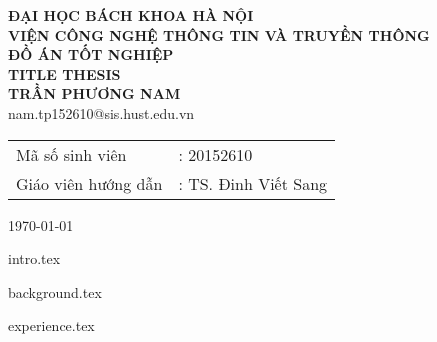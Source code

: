 \documentclass[11pt,a4paper]{article}
\author{TRẦN PHƯƠNG NAM}
\begin{document}

\begin{titlepage}
\begin{center}
\Large{\textbf{ĐẠI HỌC BÁCH KHOA HÀ NỘI}}\\[3mm]
\Large{\textbf{VIỆN CÔNG NGHỆ THÔNG TIN VÀ TRUYỀN THÔNG}}\\[3mm]
\vspace{7cm}
\huge{\textbf{ĐỒ ÁN TỐT NGHIỆP}}\\[5mm]
\huge{\textbf{TITLE THESIS}}\\[3mm]
\Large{\textbf{TRẦN PHƯƠNG NAM}}\\[1mm]
\Large{nam.tp152610@sis.hust.edu.vn}\\

\vspace{6cm}
\begin{tabular}{ll}
Mã số sinh viên & : 20152610 \\
Giáo viên hướng dẫn & : TS. Đinh Viết Sang
\end{tabular}
\vfill

\today
\end{center}
\end{titlepage}



\tableofcontents
\pagebreak
\renewcommand{\thefigure}{\arabic{section}.\arabic{figure}} %
\renewcommand{\thetable}{\arabic{section}.\arabic{table}} %


\listoftables
\pagebreak

\listoffigures
\pagebreak


\pagebreak

{intro.tex}

\pagebreak
%
\setcounter{figure}{0}
\setcounter{table}{0}


{background.tex}

\pagebreak

{experience.tex}
\end{document}
